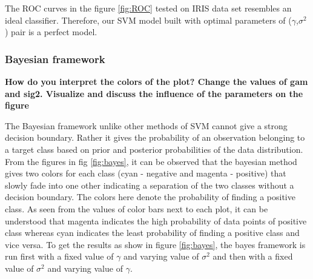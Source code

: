 {The ROC curves in the figure \ref{fig:ROC} tested on IRIS data set resembles an ideal classifier. Therefore, our SVM model built with optimal parameters of ($\gamma$,$\sigma^2$) pair is a perfect model.
\subsubsection{Bayesian framework}
\textbf{How do you interpret the colors of the plot? Change the values of gam and sig2. Visualize and discuss the influence of the parameters on the figure}

The Bayesian framework unlike other methods of SVM cannot give a strong decision boundary. Rather it gives the probability of an observation belonging to a target class based on prior and posterior probabilities of the data distribution. From the figures in fig \ref{fig:bayes}, it can be observed that the bayesian method gives two colors for each class (cyan - negative and magenta - positive) that slowly fade into one other indicating a separation of the two classes without a decision boundary. The colors here denote the probability of finding a positive class. As seen from the values of color bars next to each plot, it can be understood that magenta indicates the high probability of data points of positive class whereas cyan indicates the least probability of finding a positive class and vice versa. To get the results as show in figure \ref{fig:bayes}, the bayes framework is run first with a fixed value of $\gamma$ and varying value of $\sigma^2$ and then  with a fixed value of $\sigma^2$ and varying value of  $\gamma$.\\

}
